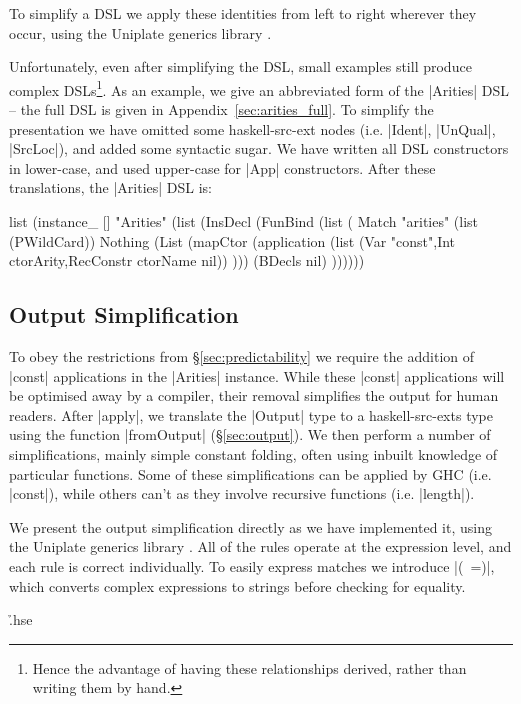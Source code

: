 \documentclass{llncs}
\begin{document}
To simplify a DSL we apply these identities from left to right wherever they occur, using the Uniplate generics library \cite{me:uniplate}.

Unfortunately, even after simplifying the DSL, small examples still produce complex DSLs\footnote{Hence the advantage of having these relationships derived, rather than writing them by hand.}. As an example, we give an abbreviated form of the |Arities| DSL -- the full DSL is given in Appendix~\ref{sec:arities_full}. To simplify the presentation we have omitted some haskell-src-ext nodes (i.e. |Ident|, |UnQual|, |SrcLoc|), and added some syntactic sugar. We have written all DSL constructors in lower-case, and used upper-case for |App| constructors. After these translations, the |Arities| DSL is:

\ignore\begin{code}
list (instance_ [] "Arities" (list (InsDecl (FunBind (list (
    Match "arities"
        (list (PWildCard))
        Nothing
        (List (mapCtor (application
            (list (Var "const",Int ctorArity,RecConstr ctorName nil))
        )))
        (BDecls nil)
))))))
\end{code}

\subsection{Output Simplification}
\label{sec:output_simplify}

To obey the restrictions from \S\ref{sec:predictability} we require the addition of |const| applications in the |Arities| instance. While these |const| applications will be optimised away by a compiler, their removal simplifies the output for human readers. After |apply|, we translate the |Output| type to a haskell-src-exts type using the function |fromOutput| (\S\ref{sec:output}). We then perform a number of simplifications, mainly simple constant folding, often using inbuilt knowledge of particular functions. Some of these simplifications can be applied by GHC (i.e. |const|), while others can't as they involve recursive functions (i.e. |length|).

We present the output simplification directly as we have implemented it, using the Uniplate generics library \cite{me:uniplate}. All of the rules operate at the expression level, and each rule is correct individually. To easily express matches we introduce |(~=)|, which converts complex expressions to strings before checking for equality.

\h{.hse}
\end{document}
